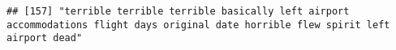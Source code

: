 \documentclass[
]{article}
\begin{document}
\begin{verbatim}
## [157] "terrible terrible terrible basically left airport accommodations flight days original date horrible flew spirit left airport dead"                                                                                                                                                                                                                                                                                                                                                                                                                                                                                                                                                                                                                                                                                                                                                                                                                                                                                                                                                                                                                                                                                                                                                                                                                                                                                                                                                                                                                                                                                                                                                                                                                                                             

\end{verbatim}
\end{document}
